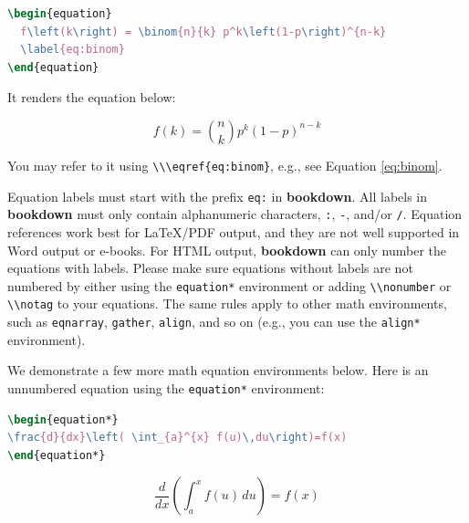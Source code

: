 \documentclass[doctor,openright,twoside]{sjtuthesis}
\newcommand{\passthrough}[1]{#1}
\theoremstyle{plain}
\theoremstyle{definition}
\theoremstyle{remark}
\theoremstyle{ocrenumbox}
\theoremstyle{plain}
\let\BeginKnitrBlock\begin \let\EndKnitrBlock\end
\begin{document}
\begin{lstlisting}[language=TeX]
\begin{equation} 
  f\left(k\right) = \binom{n}{k} p^k\left(1-p\right)^{n-k}
  \label{eq:binom}
\end{equation} 
\end{lstlisting}

It renders the equation below:

\begin{equation}
f\left(k\right)=\binom{n}{k}p^k\left(1-p\right)^{n-k} \label{eq:binom}
\end{equation}

You may refer to it using \passthrough{\lstinline!\\\eqref{eq:binom}!}, e.g., see Equation \eqref{eq:binom}.

\BeginKnitrBlock{rmdcaution}
Equation labels must start with the prefix \passthrough{\lstinline!eq:!} in \textbf{bookdown}. All labels in \textbf{bookdown} must only contain alphanumeric characters, \passthrough{\lstinline!:!}, \passthrough{\lstinline!-!}, and/or \passthrough{\lstinline!/!}. Equation references work best for LaTeX/PDF output, and they are not well supported in Word output or e-books. For HTML output, \textbf{bookdown} can only number the equations with labels. Please make sure equations without labels are not numbered by either using the \passthrough{\lstinline!equation*!} environment or adding \passthrough{\lstinline!\\nonumber!} or \passthrough{\lstinline!\\notag!} to your equations. The same rules apply to other math environments, such as \passthrough{\lstinline!eqnarray!}, \passthrough{\lstinline!gather!}, \passthrough{\lstinline!align!}, and so on (e.g., you can use the \passthrough{\lstinline!align*!} environment).
\EndKnitrBlock{rmdcaution}

We demonstrate a few more math equation environments below. Here is an unnumbered equation using the \passthrough{\lstinline!equation*!} environment:

\begin{lstlisting}[language=TeX]
\begin{equation*} 
\frac{d}{dx}\left( \int_{a}^{x} f(u)\,du\right)=f(x)
\end{equation*} 
\end{lstlisting}

\begin{equation*}
\frac{d}{dx}\left( \int_{a}^{x} f(u)\,du\right)=f(x)
\end{equation*}
\end{document}
